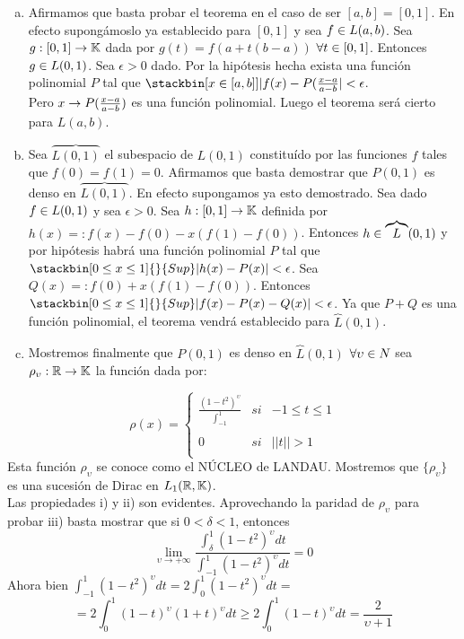 \begin{enumerate}[a)]
\item Afirmamos que basta probar el teorema en el caso de ser $[a,b]=[0,1]$. En efecto supongámoslo ya establecido para $[0,1]$ y sea $f \in L(a,b)$. Sea $g:[0,1] \rightarrow \mathbb{K}$ dada por $g(t)=f(a+t(b-a))$ $\forall t \in [0,1]$. Entonces $g \in L(0,1)$. Sea $\epsilon >0$ dado. Por la hipótesis hecha exista una función polinomial $P$ tal que $\stackbin[x \en [a,b]]{}{|f(x)-P(\frac{x-a}{a-b}|}<\epsilon$.\\
Pero $x\rightarrow P(\frac{x-a}{a-b})$ es una función polinomial. Luego el teorema será cierto para $L(a,b)$. 
\item Sea $\overbrace{L(0,1)}$ el subespacio de $L(0,1)$ constituído por las funciones $f$ tales que $f(0)=f(1)=0$. Afirmamos que basta demostrar que $P(0,1)$ es denso en $\overbrace{L(0,1)}$. En efecto supongamos ya esto demostrado. Sea dado $f \in L(0,1)$ y sea $\epsilon >0$. Sea $h:[0,1]\rightarrow \mathbb{K}$ definida por $h(x)=:f(x)-f(0)-x(f(1)-f(0))$. Entonces $h \in \overbrace{L}(0,1)$ y por hipótesis habrá una función polinomial $P$ tal que $\stackbin[0 \leq x \leq 1]{}{Sup} |h(x)-P(x)| < \epsilon$. Sea $Q(x)=: f(0)+x(f(1)-f(0))$. Entonces $\stackbin[0 \leq x \leq 1]{}{Sup} |f(x)-P(x)-Q(x)| < \epsilon$. Ya que $P+Q$ es una función polinomial, el teorema vendrá establecido para $\overbrace{L}(0,1)$.
\item Mostremos finalmente que $P(0,1)$ es denso en $\overbrace{L}(0,1)$ $\forall \upsilon \in N$ sea $\rho_\upsilon:\mathbb{R} \rightarrow \mathbb{K}$ la función dada por:
\end{enumerate}
\begin{equation*}
\rho (x)=\left\{ \begin{array}{lcc}
        \frac{(1-t^2)^\upsilon}{\int_{-1}^1} & si & -1 \leq t \leq 1 \\
             \\  0 & si &||t|| > 1 \\
             \end{array}
   \right.
\end{equation*}
Esta función $\rho_\upsilon$ se conoce como el NÚCLEO de LANDAU. Mostremos que $\lbrace \rho_\upsilon \rbrace$ es una sucesión de Dirac en $L_1 (\mathbb{R}, \mathbb{K})$. \\
Las propiedades i) y ii) son evidentes. Aprovechando la paridad de $\rho_\upsilon$ para probar iii) basta mostrar que si $0<\delta<1$, entonces 
$$
\lim_{\upsilon \to +\infty}\frac{\int_{\delta}^1 (1-t^2)^\upsilon dt}{\int_{-1}^1 (1-t^2)^\upsilon dt}=0
$$
Ahora bien $\int_{-1}^1 (1-t^2)^\upsilon dt=2\int_0^1 (1-t^2)^\upsilon dt=
$
$$
=2\int_0^1 (1-t)^\upsilon (1+t)^\upsilon dt \geq 2\int_0^1 (1-t)^\upsilon dt=\frac{2}{\upsilon +1}
$$

